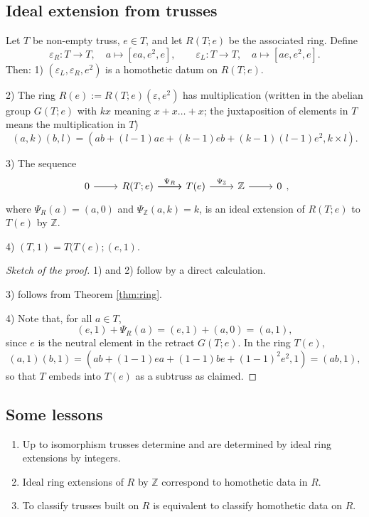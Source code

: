 \documentclass{svmult}
\newcommand{\Z}{\mathbb{Z}}
\begin{document}
\subsection{Ideal extension from trusses}

\begin{theorem}
Let $T$ be non-empty truss, $e\in T$, and let $R(T;e)$ be the associated ring. Define
\[
\varepsilon_R : T \to T,\quad a\mapsto [ea,e^2,e], \qquad \varepsilon_L : T \to T,\quad a\mapsto [ae,e^2,e].
\]
Then:
1) $(\varepsilon_L,\varepsilon_R, e^2)$ is a homothetic datum on $R(T;e)$.

2) The ring $R(e):= R(T;e)(\varepsilon ,e^2)$ has multiplication (written in the abelian group $G(T;e)$ with $kx$ meaning $x+x\ldots +x$; the juxtaposition of elements in $T$ means the multiplication in $T$)
\[
(a,k)(b,l) = (ab +(l-1)ae+(k-1)eb + (k-1)(l-1)e^2, k\times l).
\]

3) The sequence
\[
    \begin{tikzcd}
	    {0} & {R(T;e)} & {T(e)} & {\Z} & {0}
	    \arrow["{\Psi_R}", from=1-2, to=1-3]
	    \arrow[from=1-1, to=1-2]
	    \arrow[from=1-2, to=1-3]
	    \arrow["{\Psi_{\Z}}", from=1-3, to=1-4]
	    \arrow[from=1-4, to=1-5]
    \end{tikzcd},
    \]
    where $\Psi_R(a) = (a,0)$ and $\Psi_\Z(a,k) = k$, is an ideal extension of $R(T;e)$ to $T(e)$ by $\Z$.
    
    4) $(T,1) = T(T(e); (e,1)$.
\end{theorem}

\begin{proof}[Sketch of the proof]
    1) and 2) follow by a direct calculation.
    
    3) follows from Theorem \ref{thm:ring}. 
    
    4) Note that, for all $a\in T$,
    \[
    (e,1) + \Psi_R(a) = (e,1) + (a,0) = (a,1),
    \]
    since $e$ is the neutral element in the retract $G(T;e)$. In the ring $T(e)$,
    \[
    (a,1)(b,1) = (ab + (1-1)ea + (1-1)be +(1-1)^2e^2 ,1) = (ab,1),
    \]
    so that $T$ embeds into $T(e)$ as a subtruss as claimed.
    \end{proof}

\subsection{Some lessons}

\begin{enumerate}
    \item Up to isomorphism trusses determine and are determined by ideal ring
    extensions by integers.
    \item Ideal ring extensions of $R$ by $\Z$ correspond to homothetic data in $R$. 
    \item To classify trusses built on $R$ is equivalent to classify homothetic data on $R$. 
\end{enumerate}
\end{document}
